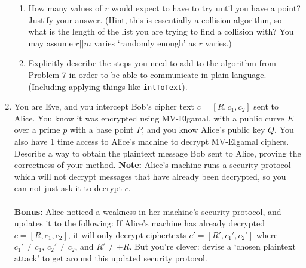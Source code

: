 \documentclass[11pt]{article}
\newcommand{\bF}{\mathbb{F}}
\begin{document}
\begin{enumerate}
{\begin{enumerate}
{    \begin{enumerate}[(1)]
      \item{
      Start with a plaintext message $m$, stored as an integer $k$-bits in length.
      }
      \item{
      Choose a random integer $r$, also $k$-bits in length.
      }
      \item{
      Compute $r||m\in\bF_p$.
      }
      \item{
      Detect if $r||m$ is the $x$ coordinate of a point in $E(\bF_p)$.  If so, compute the $y$ coordinate, and return $P = (r||m,y)$ as your plaintext for the elliptic curve encryption.  Otherwise return to step 2.
      }
    \end{enumerate}
    Describe exactly how Step 4 would be carried out.  (You may assume that you have a fast algorithm to compute square roots modulo $p$ if they exist).  Conversely explain how to reverse the algorithm to recover the plaintext from a point.
    }
    \item{
    How many values of $r$ would expect to have to try until you have a point?  Justify your answer.  (Hint, this is essentially a collision algorithm, so what is the length of the list you are trying to find a collision with?  You may assume $r||m$ varies `randomly enough' as $r$ varies.)
    }
    \item{
    Explicitly describe the steps you need to add to the algorithm from Problem 7 in order to be able to communicate in plain language.  (Including applying things like \verb|intToText|).
    }
  \end{enumerate}
  }
  \item{
  You are Eve, and you intercept Bob's cipher text $c = [R,c_1,c_2]$ sent to Alice.  You know it was encrypted using MV-Elgamal, with a public curve $E$ over a prime $p$ with a base point $P$, and you know Alice's public key $Q$.  You also have 1 time access to Alice's machine to decrypt MV-Elgamal ciphers.  Describe a way to obtain the plaintext message Bob sent to Alice, proving the correctness of your method.  \textbf{Note:} Alice's machine runs a security protocol which will not decrypt messages that have already been decrypted, so you can not just ask it to decrypt $c$.\\
  \\
  \textbf{Bonus: }Alice noticed a weakness in her machine's security protocol, and updates it to the following: If Alice's machine has already decrypted $c = [R,c_1,c_2]$, it will only decrypt ciphertexts $c' = [R',c_1',c_2']$ where $c_1'\not=c_1$, $c_2'\not=c_2$, and $R'\not=\pm R$.  But you're clever: devise a `chosen plaintext attack' to get around this updated security protocol.
  }
\end{enumerate}
\end{document}
